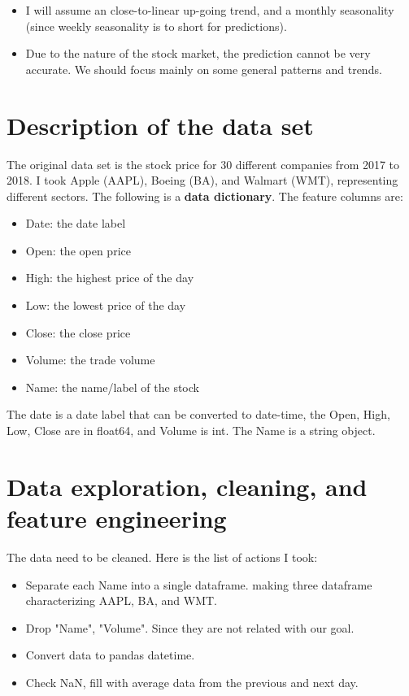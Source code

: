 \documentclass[11pt]{article}
\begin{document}
\begin{itemize}
\item I will assume an close-to-linear up-going trend, and a monthly seasonality (since weekly seasonality is to short for predictions).
\item Due to the nature of the stock market, the prediction cannot be very accurate. We should focus mainly on some general patterns and trends.
\end{itemize}

\section{Description of the data set}\label{section-introduction-2}
The original data set is the stock price for 30 different companies from 2017 to 2018. I took Apple (AAPL), Boeing (BA), and Walmart (WMT), representing different sectors.
The following is a \textbf{data dictionary}. 
The feature columns are:

\begin{itemize}
\item Date: the date label
\item Open: the open price
\item High: the highest price of the day
\item Low: the lowest price of the day
\item Close: the close price
\item Volume: the trade volume
\item Name: the name/label of the stock
\end{itemize}

The date is a date label that can be converted to date-time, the Open, High, Low, Close are in float64, and Volume is int. The Name is a string object.

\section{Data exploration, cleaning, and feature engineering}\label{section-introduction-3}
The data need to be cleaned. Here is the list of actions I took:

\begin{itemize}
\item Separate each Name into a single dataframe. making three dataframe characterizing AAPL, BA, and WMT. 
\item Drop "Name", "Volume". Since they are not related with our goal.
\item Convert data to pandas datetime.
\item Check NaN, fill with average data from the previous and next day.
\end{itemize}
\end{document}
